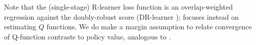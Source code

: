 \documentclass[opre,nonblindrev]{informs4}
\begin{document}
Note that the (single-stage) R-learner loss function is an overlap-weighted \citep{li2019addressing} regression against the doubly-robust score (DR-learner \citep{kennedy2020optimal}); \citet{javurek2026orthogonal} focuses instead on estimating $Q$ functions.  We do make a margin assumption to relate convergence of Q-function contrasts to policy value, analogous to \citep{shi2022statistically,hu2024fast}.%



\end{document}
